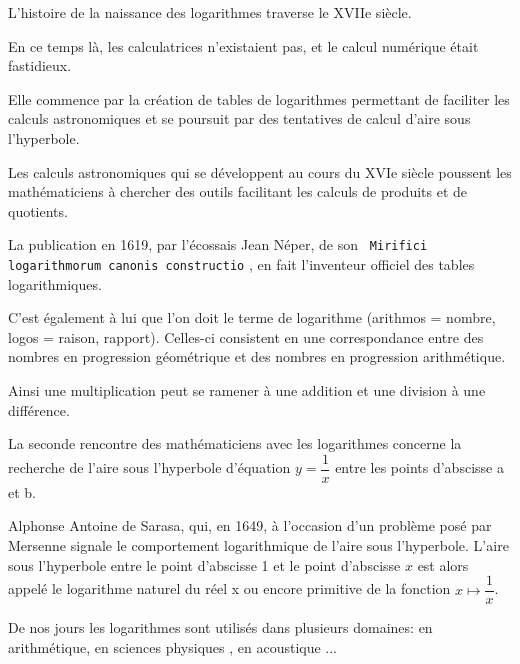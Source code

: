 





\change


L'histoire de la naissance des logarithmes  traverse le XVIIe siècle.


\change


En ce temps là, les calculatrices n'existaient pas, et le calcul numérique était fastidieux.


\change


 Elle commence par la création de tables de logarithmes  permettant de faciliter les calculs astronomiques  et se poursuit par des tentatives de calcul d'aire sous l'hyperbole.


\change


Les calculs astronomiques qui se développent au cours du XVIe siècle poussent les mathématiciens à chercher des outils facilitant les calculs de produits et de quotients.

\change


La publication en 1619, par  l'écossais Jean Néper, de son \texttt{ Mirifici logarithmorum canonis constructio} , en fait l'inventeur officiel des tables logarithmiques.


\change


 C'est également à lui que l'on doit le terme de logarithme (arithmos = nombre, logos = raison, rapport). Celles-ci consistent  en une correspondance entre des nombres en progression géométrique et des nombres en progression arithmétique.
 
 
 \change
 
  Ainsi une multiplication peut se ramener à une addition et une division à une différence.

\change

La seconde rencontre des mathématiciens avec les logarithmes concerne la recherche de  l'aire sous l'hyperbole d'équation   $ y=\dfrac{1}{x} $  entre les points d'abscisse a et b. 

\change


Alphonse Antoine de Sarasa, qui, en 1649, à l'occasion d'un problème posé par  Mersenne signale le comportement logarithmique de l'aire sous l'hyperbole. L'aire sous l'hyperbole entre le point d'abscisse 1 et le point d'abscisse $ x $ est alors appelé  le logarithme naturel   du réel x  ou  encore  primitive  de la fonction   $x\mapsto  \dfrac{1}{x} $.

\change

De nos  jours les logarithmes sont utilisés dans plusieurs domaines:\; en arithmétique, en sciences physiques , en  acoustique ...


